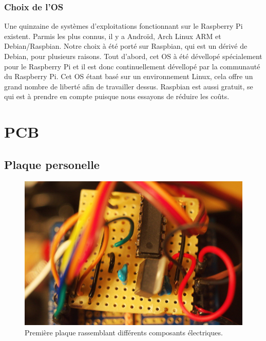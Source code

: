 \documentclass[a4paper,11pt]{report}
\begin{document}
{\subsubsection{Choix de l'OS}
Une quinzaine de systèmes d'exploitations fonctionnant sur le Raspberry Pi existent. Parmis les plus connus, il y a Androïd, Arch Linux ARM et Debian/Raspbian. 
Notre choix à été porté sur Raspbian, qui est un dérivé de Debian, pour plusieurs raisons. Tout d'abord, cet OS à été dévellopé spécialement pour le Raspberry Pi et il est donc continuellement dévellopé par la communauté du Raspberry Pi. Cet OS étant basé sur un environnement Linux, cela offre un grand nombre de liberté afin de travailler dessus. Raspbian est aussi gratuit, se qui est à prendre en compte puisque nous essayons de réduire les coûts.  


\section{PCB}

\subsection{Plaque personelle}
\begin{figure}[h]
\centering
\includegraphics[width=1.0\textwidth]{figures/DSC_1116res}
    \caption{\label{PPFigure}Première plaque rassemblant différents composants électriques. 
    }
\end{figure}

}
\end{document}
